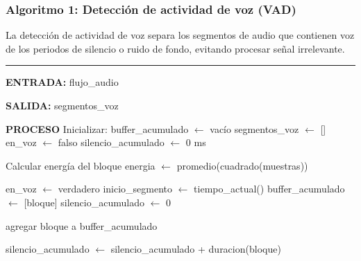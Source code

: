 \subsubsection{Algoritmo 1: Detección de actividad de voz (VAD)}
\label{apend:vad}

La detección de actividad de voz separa los segmentos de audio que contienen voz de
los periodos de silencio o ruido de fondo, evitando procesar señal irrelevante.

\begin{center}
\label{alg:vad}
\end{center}
\vspace{-1.8cm}
\rule{\textwidth}{0.4pt}
\vspace{-0.9cm}

\begin{algorithmic}[1]

\Statex \textbf{ENTRADA:}
\Statex \hspace{0.5cm} flujo\_audio 

\Statex
\Statex \textbf{SALIDA:}
\Statex \hspace{0.5cm} segmentos\_voz 

\Statex
\Statex \textbf{PROCESO}
\State Inicializar:
\State \hspace{0.5cm} buffer\_acumulado   $\gets$ vacío
\State \hspace{0.5cm} segmentos\_voz      $\gets$ []
\State \hspace{0.5cm} en\_voz             $\gets$ falso
\State \hspace{0.5cm} silencio\_acumulado $\gets$ 0 ms

\Statex
{}

    \State Calcular energía del bloque
    \State energia $\gets$ promedio(cuadrado(muestras))

    \Statex
        \State en\_voz             $\gets$ verdadero
        \State inicio\_segmento    $\gets$ tiempo\_actual()
        \State buffer\_acumulado   $\gets$ [bloque]
        \State silencio\_acumulado $\gets$ 0

    \Statex
        \State agregar bloque a buffer\_acumulado


            \State silencio\_acumulado $\gets$ silencio\_acumulado + duracion(bloque)


\end{algorithmic}
